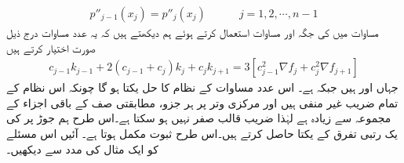 \begin{align*}
p''_{j-1}(x_j)=p''_j(x_j)\quad \quad \quad j=1,2,\cdots,n-1
\end{align*}
مساوات  میں  کی جگہ   اور مساوات   استعمال کرتے ہوئے ہم دیکھتے ہیں کہ یہ  عدد مساوات درج ذیل صورت اختیار کرتے ہیں
\begin{align}\label{مساوات_اعدادی_دو_درجی_تفرق_پ}
c_{j-1}k_{j-1}+2(c_{j-1}+c_j)k_j+c_jk_{j+1}=3[c^2_{j-1}\nabla f_j+c_j^2\nabla f_{j+1}]
\end{align} 
جہاں  اور  ہیں جبکہ  ہے۔ اس  عدد مساوات کے نظام کا حل  یکتا ہو گا چونکہ اس نظام کے تمام  ضریب  غیر منفی ہیں اور مرکزی وتر پر ہر جزو، مطابقتی صف کے باقی  اجزاء کے مجموعہ سے زیادہ  ہے  لہٰذا  ضریب  قالب صفر نہیں ہو سکتا ہے۔اس طرح ہم جوڑ پر  کی یک رتبی تفرق کے یکتا  حاصل کرتے ہیں۔اس طرح ثبوت مکمل ہوتا ہے۔
آئیں اس مسئلے کو ایک مثال کی مدد سے دیکھیں۔

